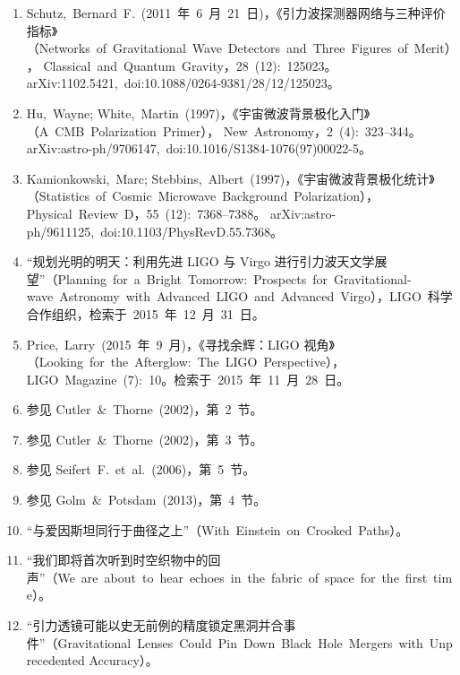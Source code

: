 \begin{enumerate}
     Scientific~American~(Blogs)。
  \item Schutz,~Bernard~F.~(2011~年~6~月~21~日)，《引力波探测器网络与三种评价指标》（Networks~of~Gravitational~Wave~Detectors~and~Three~Figures~of~Merit），
    Classical~and~Quantum~Gravity，28~(12):~125023。
    arXiv:1102.5421,~doi:10.1088/0264-9381/28/12/125023。
  \item Hu,~Wayne; White,~Martin~(1997)，《宇宙微波背景极化入门》（A~CMB~Polarization~Primer），
        New~Astronomy，2~(4):~323–344。
        arXiv:astro-ph/9706147,~doi:10.1016/S1384-1076(97)00022-5。
  \item Kamionkowski,~Marc; Stebbins,~Albert~(1997)，《宇宙微波背景极化统计》（Statistics~of~Cosmic~Microwave~Background~Polarization），
        Physical~Review~D，55~(12):~7368–7388。
        arXiv:astro-ph/9611125,~doi:10.1103/PhysRevD.55.7368。
  \item “规划光明的明天：利用先进 LIGO 与 Virgo 进行引力波天文学展望”（Planning~for~a~Bright~Tomorrow:~Prospects~for~Gravitational-wave~Astronomy~with~Advanced~LIGO~and~Advanced~Virgo），LIGO~科学合作组织，检索于~2015~年~12~月~31~日。
  \item Price,~Larry~(2015~年~9~月)，《寻找余辉：LIGO 视角》（Looking~for~the~Afterglow:~The~LIGO~Perspective），
    LIGO~Magazine~(7):~10。检索于~2015~年~11~月~28~日。
  \item 参见 Cutler~\&~Thorne~(2002)，第~2~节。
  \item 参见 Cutler~\&~Thorne~(2002)，第~3~节。
  \item 参见 Seifert~F.~et~al.~(2006)，第~5~节。
  \item 参见 Golm~\&~Potsdam~(2013)，第~4~节。
  \item “与爱因斯坦同行于曲径之上”（With~Einstein~on~Crooked~Paths）。
  \item “我们即将首次听到时空织物中的回声”（We~are~about~to~hear~echoes~in~the~fabric~of~space~for~the~first~time）。
  \item “引力透镜可能以史无前例的精度锁定黑洞并合事件”（Gravitational~Lenses~Could~Pin~Down~Black~Hole~Mergers~with~Unprecedented Accuracy）。
\end{enumerate}

